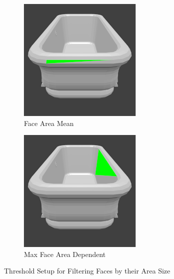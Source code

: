 \begin{figure}
\begin{subfigure}{.32\textwidth}
		\includegraphics[width=\textwidth]{images/face_area_mean.png}
		\caption{Face Area Mean}
		\label{fig:face-area-mean}
	\end{subfigure}
	\begin{subfigure}{.32\textwidth}
		\centering
		\includegraphics[width=\textwidth]{images/face_area_max_dependent.png}
		\caption{Max Face Area Dependent}
		\label{fig:face-area-max-dependent}
	\end{subfigure}
	\caption{Threshold Setup for Filtering Faces by their Area Size}
	\label{fig:face-area-filter}
\end{figure}
